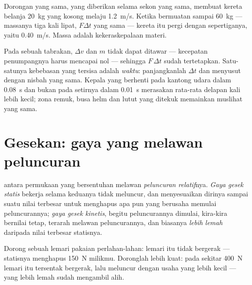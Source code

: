 \begin{example}\label{ex:g11:forces-and-motion:cart}
Dorongan yang sama, yang diberikan selama sekon yang sama, membuat
kereta belanja \qty{20}{kg} yang kosong melaju \qty{1.2}{m/s}. Ketika
bermuatan sampai \qty{60}{kg} --- massanya tiga kali lipat, $F\Delta t$
yang sama --- kereta itu pergi dengan sepertiganya, yaitu
\qty{0.40}{m/s}. Massa adalah kekeraskepalaan materi.
\end{example}

\begin{remark}\label{rem:g11:forces-and-motion:airbag}
Pada sebuah tabrakan, $\Delta v$ dan $m$ tidak dapat ditawar ---
kecepatan penumpangnya harus mencapai nol --- sehingga $F\,\Delta t$
sudah tertetapkan. Satu-satunya kebebasan yang tersisa adalah
\emph{waktu}: panjangkanlah $\Delta t$ dan  menyusut dengan
nisbah yang sama. Kepala yang berhenti pada kantong udara dalam
\qty{0.08}{s} dan bukan pada setirnya dalam \qty{0.01}{s} merasakan
 rata-rata delapan kali lebih kecil; zona remuk, busa helm dan lutut
yang ditekuk memainkan muslihat yang sama.
\end{remark}

\section{Gesekan: gaya yang melawan peluncuran}

\begin{definition}\label{def:g11:forces-and-motion:friction}
 antara permukaan yang bersentuhan melawan \emph{peluncuran
relatif}nya. \emph{Gaya gesek statis} bekerja
selama keduanya tidak meluncur, dan menyesuaikan dirinya sampai suatu
nilai terbesar untuk menghapus apa pun yang berusaha memulai
peluncurannya; \emph{gaya gesek kinetis},
begitu peluncurannya dimulai, kira-kira bernilai tetap, terarah melawan
peluncurannya, dan biasanya \emph{lebih lemah} daripada nilai terbesar
 statisnya.
\end{definition}

\begin{example}\label{ex:g11:forces-and-motion:wardrobe}
Dorong sebuah lemari pakaian perlahan-lahan: lemari itu tidak bergerak
---  statisnya menghapus \qty{150}{N} milikmu. Doronglah lebih
kuat: pada sekitar \qty{400}{N} lemari itu tersentak bergerak, lalu
meluncur dengan usaha yang lebih kecil ---  yang lebih
lemah sudah mengambil alih.
\end{example}

